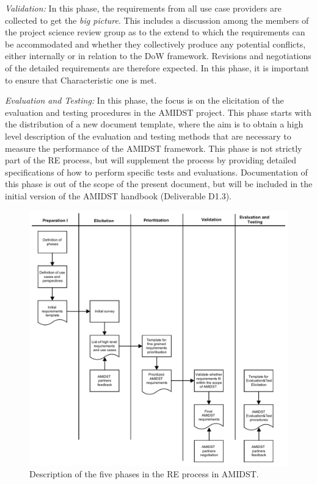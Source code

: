 \emph{Validation:} In this phase, the requirements from all use case providers are collected to get the \emph{big
  picture}.  This includes a discussion among the members of the  project science review group as to the extend to which 
the
requirements can be accommodated and whether they collectively produce any potential conflicts, either internally or in
relation to the
DoW framework. Revisions and negotiations of the detailed requirements are therefore expected.  In this phase, it is 
important to ensure that Characteristic one is met.

 \emph{Evaluation and Testing:} In this phase, the focus is on the elicitation of the evaluation and testing procedures
 in the AMIDST project. This phase starts with the distribution of a new document template, where the aim is to obtain a
 high level description of the evaluation and testing methods that are necessary to measure the performance of the AMIDST
 framework. This phase is not strictly part of the RE process, but will supplement the process by providing
 detailed specifications of how to perform specific tests and evaluations. Documentation of this phase is out of the scope of 
the present document, but will
 be included in the initial version of the AMIDST handbook (Deliverable D1.3).    


\begin{figure}[htbp]
\centering
\includegraphics [keepaspectratio,width =\linewidth] {amidst_re}
\caption{Description of the five phases in the RE process in AMIDST.}
\label{REprocess1}
\end{figure}



